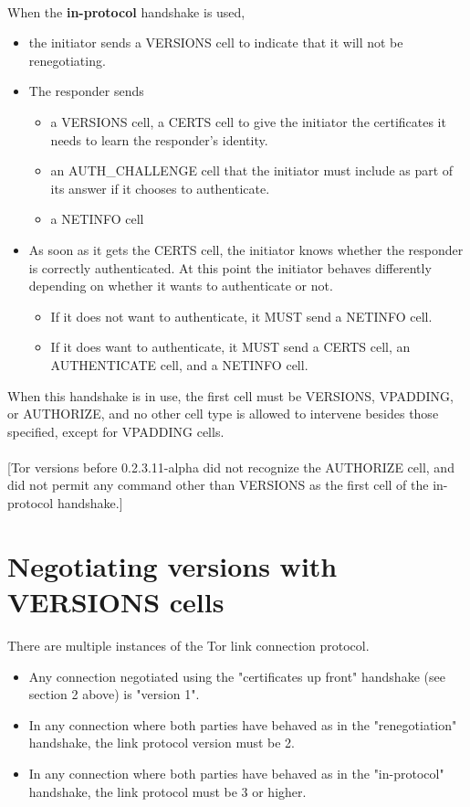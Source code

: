 \paragraph{}
When the \textbf{in-protocol} handshake is used,
\begin{itemize}
    \item the initiator sends a VERSIONS cell to indicate that it will not be renegotiating.
    \item The responder sends
    \begin{itemize}
        \item a VERSIONS cell, a CERTS cell to give the
        initiator the certificates it needs to learn the responder's
        identity.
        \item an AUTH\_CHALLENGE cell that the initiator must include
        as part of its answer if it chooses to authenticate.
        \item a NETINFO cell
    \end{itemize}
    \item As soon as it gets the CERTS cell, the initiator knows
    whether the responder is correctly authenticated. At this point the
    initiator behaves differently depending on whether it wants to
    authenticate or not.
    \begin{itemize}
        \item If it does not want to authenticate, it MUST send a NETINFO cell.
        \item If it does want to authenticate, it MUST send a CERTS cell,
        an AUTHENTICATE cell, and a NETINFO cell.
    \end{itemize}
\end{itemize}
When this handshake is in use, the first cell must be VERSIONS, VPADDING, or
AUTHORIZE, and no other cell type is allowed to intervene besides
those specified, except for VPADDING cells.

\paragraph{}
[Tor versions before 0.2.3.11-alpha did not recognize the AUTHORIZE cell,
and did not permit any command other than VERSIONS as the first cell of
the in-protocol handshake.]


\section{Negotiating versions with VERSIONS cells}
There are multiple instances of the Tor link connection protocol.
\begin{itemize}
    \item
    Any connection negotiated using the "certificates up front" handshake (see
    section 2 above) is "version 1".
    \item In any connection where both parties
    have behaved as in the "renegotiation" handshake, the link protocol
    version must be 2.
    \item In any connection where both parties have behaved
    as in the "in-protocol" handshake, the link protocol must be 3 or higher.
\end{itemize}

